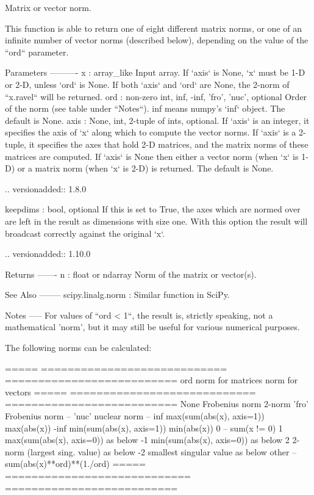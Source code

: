\begin{DoxyVerb}Matrix or vector norm.

This function is able to return one of eight different matrix norms,
or one of an infinite number of vector norms (described below), depending
on the value of the ``ord`` parameter.

Parameters
----------
x : array_like
    Input array.  If `axis` is None, `x` must be 1-D or 2-D, unless `ord`
    is None. If both `axis` and `ord` are None, the 2-norm of
    ``x.ravel`` will be returned.
ord : {non-zero int, inf, -inf, 'fro', 'nuc'}, optional
    Order of the norm (see table under ``Notes``). inf means numpy's
    `inf` object. The default is None.
axis : {None, int, 2-tuple of ints}, optional.
    If `axis` is an integer, it specifies the axis of `x` along which to
    compute the vector norms.  If `axis` is a 2-tuple, it specifies the
    axes that hold 2-D matrices, and the matrix norms of these matrices
    are computed.  If `axis` is None then either a vector norm (when `x`
    is 1-D) or a matrix norm (when `x` is 2-D) is returned. The default
    is None.

    .. versionadded:: 1.8.0

keepdims : bool, optional
    If this is set to True, the axes which are normed over are left in the
    result as dimensions with size one.  With this option the result will
    broadcast correctly against the original `x`.

    .. versionadded:: 1.10.0

Returns
-------
n : float or ndarray
    Norm of the matrix or vector(s).

See Also
--------
scipy.linalg.norm : Similar function in SciPy.

Notes
-----
For values of ``ord < 1``, the result is, strictly speaking, not a
mathematical 'norm', but it may still be useful for various numerical
purposes.

The following norms can be calculated:

=====  ============================  ==========================
ord    norm for matrices             norm for vectors
=====  ============================  ==========================
None   Frobenius norm                2-norm
'fro'  Frobenius norm                --
'nuc'  nuclear norm                  --
inf    max(sum(abs(x), axis=1))      max(abs(x))
-inf   min(sum(abs(x), axis=1))      min(abs(x))
0      --                            sum(x != 0)
1      max(sum(abs(x), axis=0))      as below
-1     min(sum(abs(x), axis=0))      as below
2      2-norm (largest sing. value)  as below
-2     smallest singular value       as below
other  --                            sum(abs(x)**ord)**(1./ord)
=====  ============================  ==========================


\end{DoxyVerb}
